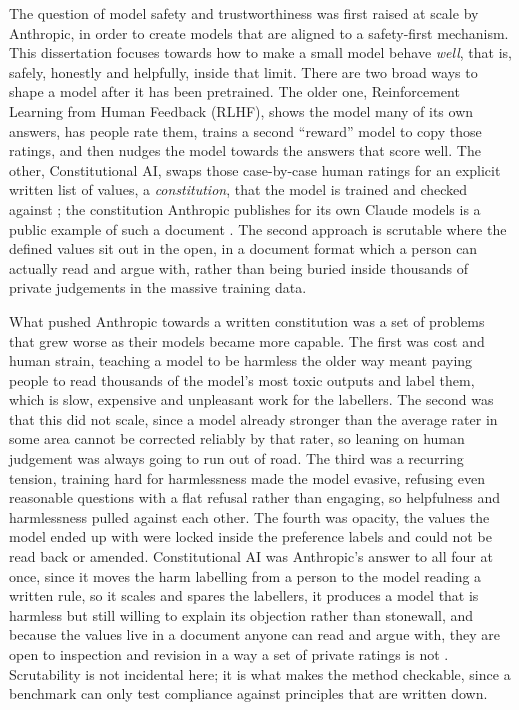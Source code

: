 The question of model safety and trustworthiness was first raised at scale by Anthropic, in order to create models that are aligned to a safety-first mechanism. This dissertation focuses towards how to make a small model behave \emph{well}, that is, safely, honestly and helpfully, inside that limit. There are two broad ways to shape a model after it has been pretrained. The older one, Reinforcement Learning from Human Feedback (RLHF), shows the model many of its own answers, has people rate them, trains a second ``reward'' model to copy those ratings, and then nudges the model towards the answers that score well. The other, Constitutional AI, swaps those case-by-case human ratings for an explicit written list of values, a \emph{constitution}, that the model is trained and checked against \cite{bai2022constitutionalaiharmlessnessai}; the constitution Anthropic publishes for its own Claude models is a public example of such a document \cite{anthropic2023claudesconstitution}. The second approach is scrutable where the defined values sit out in the open, in a document format which a person can actually read and argue with, rather than being buried inside thousands of private judgements in the massive training data.

What pushed Anthropic towards a written constitution was a set of problems that grew worse as their models became more capable. The first was cost and human strain, teaching a model to be harmless the older way meant paying people to read thousands of the model's most toxic outputs and label them, which is slow, expensive and unpleasant work for the labellers. The second was that this did not scale, since a model already stronger than the average rater in some area cannot be corrected reliably by that rater, so leaning on human judgement was always going to run out of road. The third was a recurring tension, training hard for harmlessness made the model evasive, refusing even reasonable questions with a flat refusal rather than engaging, so helpfulness and harmlessness pulled against each other. The fourth was opacity, the values the model ended up with were locked inside the preference labels and could not be read back or amended. Constitutional AI was Anthropic's answer to all four at once, since it moves the harm labelling from a person to the model reading a written rule, so it scales and spares the labellers, it produces a model that is harmless but still willing to explain its objection rather than stonewall, and because the values live in a document anyone can read and argue with, they are open to inspection and revision in a way a set of private ratings is not \cite{bai2022constitutionalaiharmlessnessai}. Scrutability is not incidental here; it is what makes the method checkable, since a benchmark can only test compliance against principles that are written down.

